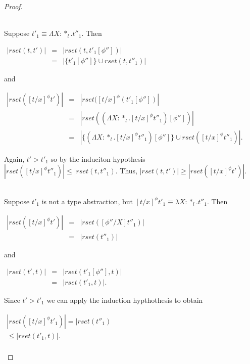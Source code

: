 \begin{proof}
\begin{itemize}
  \ \\
  Suppose $t'_1 \equiv \Lambda X:*_l.t''_1$.  Then 
  \begin{center}
    \begin{math}
      \begin{array}{lll}
        |rset(t,t')| & = & |rset(t, t'_1[\phi''])|\\
        & = & |\{t'_1[\phi'']\} \cup rset(t,t''_1)|
      \end{array}
    \end{math}
  \end{center}
  and
  \begin{center}
    \begin{math}
      \begin{array}{lll}
        |rset([t/x]^\phi t')| & = & |rset([t/x]^\phi(t'_1[\phi''])|\\
        & = & |rset((\Lambda X:*_l.[t/x]^\phi t''_1)[\phi''])|\\
        & = & |\{(\Lambda X:*_l.[t/x]^\phi t''_1)[\phi'']\} \cup rset([t/x]^\phi t''_1)|.
      \end{array}
    \end{math}
  \end{center}
  Again, $t' > t'_1$ so by the induciton hypothesis $|rset([t/x]^\phi t''_1)| \leq |rset(t,t''_1)$.  Thus,
  $|rset(t,t')| \geq |rset([t/x]^\phi t')|$.
  
  \ \\
  Suppose $t'_1$ is not a type abstraction, but $[t/x]^\phi t'_1 \equiv \lambda X:*_l.t''_1$.  Then
  \begin{center}
    \begin{math}
      \begin{array}{lll}
        |rset([t/x]^\phi t')| & = & |rset([\phi''/X]t''_1)|\\
        & = & |rset(t''_1)|
      \end{array}
    \end{math}
  \end{center}
  and
  \begin{center}
    \begin{math}
      \begin{array}{lll}
        |rset(t',t)| & = & |rset(t'_1[\phi''], t)|\\
        & = & |rset(t'_1,t)|.
      \end{array}
    \end{math}
  \end{center}
  Since $t' > t'_1$ we can apply the induction hypthothesis to obtain
  \begin{center}
    \begin{math}
      \begin{array}{lll}
        |rset([t/x]^\phi t'_1)| = |rset(t''_1)\\ 
        \leq |rset(t'_1,t)|.\\
        

\end{array}
\end{math}
\end{center}
\end{itemize}
\end{proof}
